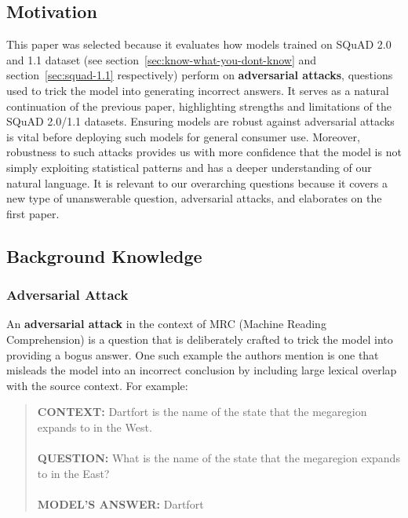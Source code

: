 \documentclass[letterpaper, 11pt]{article}
\begin{document}
\subsection{Motivation}
This paper \citep{impactsofunanswerable} was selected because it evaluates how models trained on SQuAD 2.0 and 1.1 dataset (see section~\ref{sec:know-what-you-dont-know} and section~\ref{sec:squad-1.1} respectively) perform on \textbf{adversarial attacks}, questions used to trick the model into generating incorrect answers. 
It serves as a natural continuation of the previous paper, highlighting strengths and limitations of the SQuAD 2.0/1.1 datasets.
Ensuring models are robust against adversarial attacks is vital before deploying such models for general consumer use. Moreover, robustness to such attacks provides us with more confidence that the model is not simply exploiting statistical patterns and has a deeper understanding of
our natural language. It is relevant to our overarching questions because it covers a new type of unanswerable question, adversarial attacks, and elaborates on the first paper.

\subsection{Background Knowledge}
\subsubsection{Adversarial Attack}
An \textbf{adversarial attack} in the context of MRC (Machine Reading Comprehension) is a question that is deliberately crafted to trick the model into providing a bogus answer. One such example the authors mention is
one that misleads the model into an incorrect conclusion by including large lexical overlap with the source context. For example:
\begin{quotation}
\noindent \textbf{CONTEXT:} Dartfort is the name of the state that the megaregion expands to in the West.
\\\\
\noindent \textbf{QUESTION:} What is the name of the state that the megaregion expands to in the East?
\\\\
\noindent \textbf{MODEL'S ANSWER:} Dartfort
\end{quotation}
\end{document}
